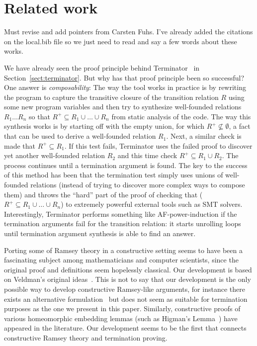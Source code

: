 \documentclass{llncs}
\newcommand{\dv}[1]{{\color{red}{\bf DV:} #1}}
\begin{document}
\section{Related work}\label{sect:related}

\dv{Must revise and add pointers from Carsten Fuhs. I've already added the citations on the local.bib file so we 
just need to read and say a few words about these works.}

We have already seen the proof principle 
behind Terminator~\cite{terminator,podelski-rybalchenko:transition} in 
Section~\ref{sect:terminator}. But why has that proof principle been so successful? One 
answer is {\em composability}: The way the tool works in practice is by rewriting the 
program to capture the transitive closure of the transition relation $R$ using some new 
program variables
and then try to synthesize well-founded relations $R_1\ldots R_n$ so that $R^{+} \subseteq R_1\cup\ldots\cup R_n$ from
static analysis of the code. The way this synthesis works is by starting off with the empty 
union, for which $R^{+} \not\subseteq \emptyset$, a fact that can be used to derive a well-founded
relation $R_1$. Next, a similar check is made that $R^{+} \subseteq R_1$. If this test fails,
Terminator uses the failed proof to discover yet another well-founded relation $R_2$ and 
this time check $R^{+} \subseteq R_1\cup R_2$. The process continues until a termination argument is
found. The key to the success of this method has been that the termination test simply 
uses unions of well-founded relations (instead of trying to discover more complex ways to 
compose them) and throws the ``hard'' part of the proof of checking that ($R^{+} \subseteq R_1\cup\ldots\cup R_n$) 
to extremely powerful external tools such as SMT solvers. Interestingly, Terminator
performs something like AF-power-induction if the termination arguments fail
for the transition relation: it starts unrolling loops until termination argument synthesis
is able to find an answer. 

Porting some of Ramsey theory in a constructive setting seems to have been a fascinating 
subject among mathematicians and computer scientists, since the original proof and 
definitions seem hopelessly classical. Our development is based on Veldman's original 
ideas~\cite{Veldman01041993,coquand-short}. This is not to say that our development 
is the only possible way to develop constructive 
Ramsey-like arguments, for instance there exists an alternative formulation~\cite{Coquand:1994:ART:185268.185270} but does 
not seem as suitable for termination purposes as the one we present in this paper. Similarly, constructive proofs of 
various homeomorphic embedding lemmas (such as Higman's Lemma~\cite{berghofer-higman,Seisenberger,Fridlender97higmanslemma})
have appeared in the literature. Our development seems to be the first that connects 
constructive Ramsey theory and termination proving. 
\end{document}
